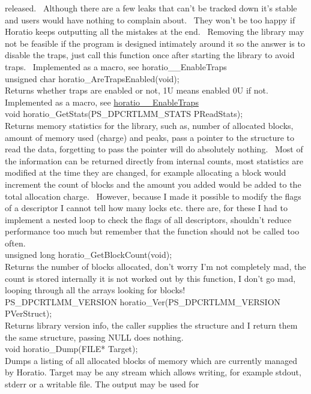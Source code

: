 \documentclass{article}
\begin{document}
released.~
Although there are a few leaks that can't be tracked down it's stable
and
users would have nothing to complain about.~ They won't be too
happy
if Horatio keeps outputting all the mistakes at the end.~
Removing
the library may not be feasible if the program is designed intimately
around
it so the answer is to disable the traps, just call this function once
after starting the library to avoid traps.~ Implemented as a
macro,
see horatio\_\_EnableTraps
\\
unsigned char horatio\_AreTrapsEnabled(void);
\\
Returns whether traps are enabled or not, 1U means enabled 0U if
not.~
Implemented as a macro, see \href{#_EnableTraps}{horatio\_\_EnableTraps}
\\
void horatio\_GetStats(PS\_DPCRTLMM\_STATS
PReadStats);
\\
Returns memory statistics for the library, such as, number of allocated
blocks, amount of memory used (charge) and peaks, pass a pointer to the
structure to read the data, forgetting to pass the pointer will do
absolutely
nothing.~ Most of the information can be returned directly from
internal
counts, most statistics are modified at the time they are changed, for
example allocating a block would increment the count of blocks and the
amount you added would be added to the total allocation charge.~
However,
because I made it possible to modify the flags of a descriptor I cannot
tell how many locks etc. there are, for these I had to implement a
nested
loop to check the flags of all descriptors, shouldn't reduce
performance
too much but remember that the function should not be called too often.
\\
unsigned long horatio\_GetBlockCount(void);
\\
Returns the number of blocks allocated, don't worry I'm not completely
mad, the count is stored internally it is not worked out by this
function,
I don't go mad, looping through all the arrays looking for blocks!
\\
PS\_DPCRTLMM\_VERSION
horatio\_Ver(PS\_DPCRTLMM\_VERSION
PVerStruct);
\\
Returns library version info, the caller supplies the structure and
I return them the same structure, passing NULL does nothing.
\\
void horatio\_Dump(FILE* Target);
\\
Dumps a listing of all allocated blocks of memory which are currently
managed by Horatio. Target may be any stream which allows writing, for
example stdout, stderr or a writable file. The output may be used for
\end{document}
